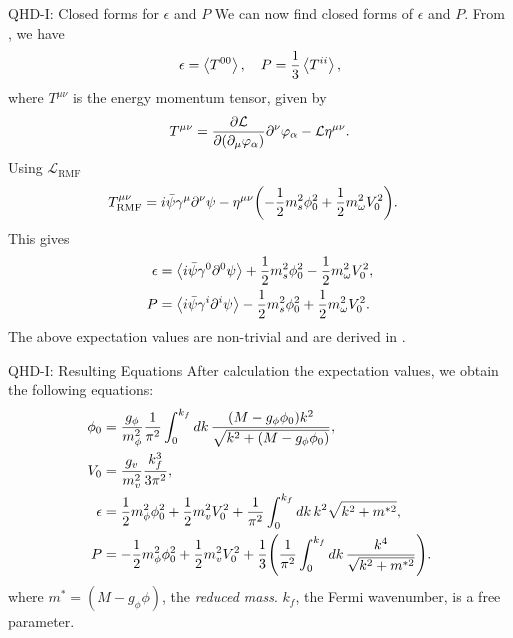 \documentclass[handout]{beamer}
\newcommand{\Letter}[1]{\mathcal{#1}}
\newcommand{\Lag}{\Letter{L}}
\newcommand{\p}{\partial}
\begin{document}
    \begin{frame}{QHD-I: Closed forms for $\epsilon$ and $P$}
        We can now find closed forms of $\epsilon$ and $P$. From \autocite{diener_2008}, we have
        \[\epsilon = \expval{T^{00}}, \quad P = \frac{1}{3}\expval{T^{ii}},\]
        where $T^{\mu\nu}$ is the energy momentum tensor, given by
        \vspace{-5pt}
        \begin{align*}
            T^{\mu\nu} = \pdv{\Lag}{(\p_\mu \varphi_\alpha)}\p^\nu \varphi_\alpha - \Lag \eta^{\mu\nu}.
        \end{align*}
        \vspace{-5pt}
        Using $\Lag_\text{RMF}$
        \vspace{-5pt}
        \begin{align*}
            T^{\mu\nu}_\text{RMF} & =i\bar\psi\gamma^\mu \p^\nu \psi - \eta^{\mu\nu} \pqty{- \frac{1}{2} m_s^2 \phi_0^2 + \frac{1}{2} m_\omega^2 V_0^2}.
        \end{align*}
        \vspace{-5pt}
        This gives
        \vspace{-15pt}
        \begin{align*}
            \epsilon & = \expval{i\bar\psi\gamma^0 \p^0 \psi} + \frac{1}{2} m_s^2 \phi_0^2 - \frac{1}{2} m_\omega^2 V_0^2,\\
            P & = \expval{i\bar\psi\gamma^i \p^i \psi}  - \frac{1}{2} m_s^2 \phi_0^2 + \frac{1}{2} m_\omega^2 V_0^2.
        \end{align*}
        The above expectation values are non-trivial and are derived in \autocite{diener_2008}.
    \end{frame}

    \begin{frame}{QHD-I: Resulting Equations}
        After calculation the expectation values, we obtain the following equations: \pause
        \begin{align*}
            \phi_0 &= \frac{g_\phi}{m_\phi^2} \frac{1}{\pi^2} \int_0^{k_f} \dd{k} \frac{(M-g_\phi \phi_0) k^2 }{\sqrt{k^2 + (M-g_\phi \phi_0)}},  \\
            V_0 &= \frac{g_v}{m_v^2} \frac{k_f^3}{3\pi^2}, \\
            \epsilon & = \frac{1}{2} m_\phi^2 \phi_0^2 + \frac{1}{2} m_v^2 V_0^2 + \frac{1}{\pi^2} \int_0^{k_f} \dd{k} k^2 \sqrt{k^2 + m^{*2}},\\
            P & = -\frac{1}{2} m_\phi^2 \phi_0^2 + \frac{1}{2} m_v^2 V_0^2 + \frac{1}{3} \pqty{\frac{1}{\pi^2} \int_0^{k_f} \dd{k}\frac{k^4}{\sqrt{k^2 + m^{*2}}}}.
        \end{align*}
        where $m^* = (M-g_\phi \phi)$, the \textit{reduced mass}. $k_f$, the Fermi wavenumber, is a free parameter. 
    \end{frame}
\end{document}
